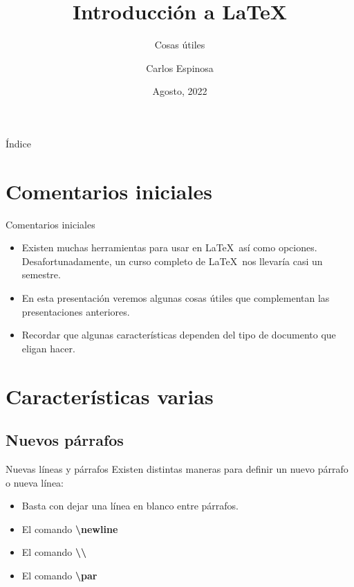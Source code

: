 \documentclass[11pt]{beamer}
\institute{Facultad de Ciencias \\ Universidad Nacional Autónoma de México}
\title{Introducci\'on a \LaTeX}
\subtitle{Cosas útiles}
\author{Carlos Espinosa}
\date{Agosto, 2022}
\begin{document}
	\begin{frame}{}
		\titlepage
	\end{frame}

	\begin{frame}{Índice}
		\tableofcontents
	\end{frame}

	\section{Comentarios iniciales}
	\begin{frame}[containsverbatim]{Comentarios iniciales}
		\begin{itemize}
			\justifying
			\item Existen muchas herramientas para usar en \LaTeX\ así como opciones. 
			Desafortunadamente, un curso completo de \LaTeX\ nos llevaría casi un semestre.
			\item En esta presentación veremos algunas cosas útiles que complementan 
			las presentaciones anteriores.
			\item Recordar que algunas características dependen del tipo de documento 
			que eligan hacer.
		\end{itemize}
\end{frame}
	\section{Características varias}
	\subsection{Nuevos párrafos}
	\begin{frame}[containsverbatim]{Nuevas l\'ineas y p\'arrafos}
		Existen distintas maneras para definir un nuevo párrafo o nueva línea:
		\begin{itemize}
			\justifying
			\item Basta con dejar una línea en blanco entre párrafos.
			\item El comando \textbf{\textbackslash newline}
			\item El comando \textbf{\textbackslash \textbackslash}
			\item El comando \textbf{\textbackslash par}
		\end{itemize}
\end{frame}
\end{document}
